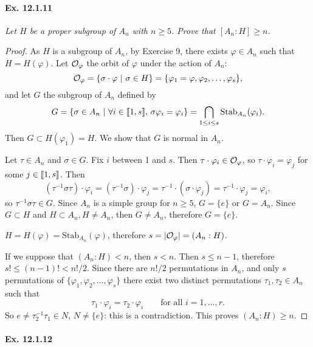 \documentclass[11pt,a4paper]{article}
\def\gcro{\mbox{[\hspace{-.15em}[}}%
\def\dcro{\mbox{]\hspace{-.15em}]}}
\begin{document}
\paragraph{Ex. 12.1.11}

{\it Let $H$ be a proper subgroup of $A_n$ with $n \geq 5$. Prove that $[A_n:H] \geq n$.
}

\begin{proof}
As $H$ is a subgroup of $A_n$, by Exercise 9, there exists $\varphi \in A_n$ such that $H = H(\varphi)$. Let ${\cal O}_{\varphi}$ the orbit of $\varphi$ under the action of $A_n$:
$${\cal O}_{\varphi} = \{\sigma \cdot \varphi\ | \ \sigma \in H\} = \{\varphi_1=\varphi, \varphi_2,\ldots,\varphi_s\},$$
and let $G$ the subgroup of $A_n$ defined by
$$G = \{\sigma \in A_n \ | \ \forall i \in \gcro 1, s \dcro,\, \sigma \varphi_i = \varphi_i\} = \bigcap_{1\leq i \leq s}\mathrm{Stab}_{A_n}(\varphi_i).$$
Then $G \subset H(\varphi_1) = H$. We show that $G$ is normal in $A_n$. 

Let $\tau \in A_n$ and $\sigma \in G$. Fix $i$ between 1 and $s$. Then $\tau \cdot \varphi_i \in {\cal O}_{\varphi}$, so $\tau \cdot \varphi_i = \varphi_j$ for some $j \in \gcro 1, s \dcro$. Then
$$(\tau^{-1} \sigma \tau)\cdot \varphi_i = (\tau^{-1} \sigma)\cdot \varphi_j = \tau^{-1} \cdot (\sigma \cdot \varphi_j) = \tau^{-1} \cdot \varphi_j = \varphi_i,$$
so $\tau^{-1} \sigma \tau \in G$.
Since $A_n$ is a simple group for $n\geq 5$, $G =\{e\}$ or $G = A_n$. Since $G \subset H$ and $H \subset A_n,H\ne A_n$, then $G \ne A_n$, therefore $G = \{e\}$.

$H = H(\varphi) = \mathrm{Stab}_{A_n}(\varphi)$, therefore $s = |{\cal O}_{\varphi}| = (A_n : H)$.

If we suppose that $(A_n:H) < n$, then $s<n$. Then $s \leq n-1$, therefore $s! \leq (n-1)! < n!/2$. Since there are $n!/2$ permutations in $A_n$, and only $s$ permutations of $ \{\varphi_1, \varphi_2,\ldots,\varphi_s\}$ there exist two distinct permutations $\tau_1,\tau_2 \in A_n$ such that
$$\tau_1\cdot \varphi_i = \tau_2 \cdot \varphi _i \qquad \text{for all } i=1,\ldots,r.$$
So $e \ne \tau_2^{-1} \tau_1 \in N$, $N \ne \{e\}$: this is a contradiction. This proves $(A_n:H) \geq n$.
\end{proof}

\paragraph{Ex. 12.1.12}
\end{document}
